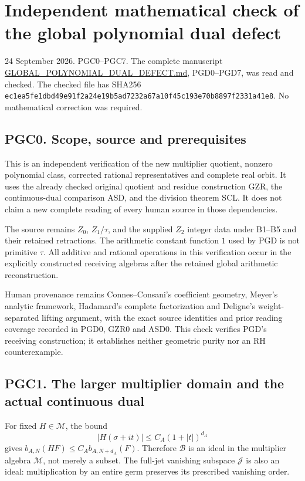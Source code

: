 \section{Independent mathematical check of the global polynomial dual
defect}\label{independent-mathematical-check-of-the-global-polynomial-dual-defect}

24 September 2026. PGC0--PGC7. The complete manuscript
\url{GLOBAL_POLYNOMIAL_DUAL_DEFECT.md}, PGD0--PGD7, was read and
checked. The checked file has SHA256
\nolinkurl{ec1ea5fe1dbd49e91f2a24e19b5ad7232a67a10f45c193e70b8897f2331a41e8}. No
mathematical correction was required.

\subsection{PGC0. Scope, source and
prerequisites}\label{pgc0.-scope-source-and-prerequisites}

This is an independent verification of the new multiplier quotient,
nonzero polynomial class, corrected rational representatives and
complete real orbit. It uses the already checked original quotient and
residue construction GZR, the continuous-dual comparison ASD, and the
division theorem SCL. It does not claim a new complete reading of every
human source in those dependencies.

The source remains \(Z_0\), \(Z_1/\tau\), and the supplied \(Z_2\)
integer data under B1--B5 and their retained retractions. The arithmetic
constant function \(1\) used by PGD is not primitive \(\tau\). All
additive and rational operations in this verification occur in the
explicitly constructed receiving algebras after the retained global
arithmetic reconstruction.

Human provenance remains Connes--Consani's coefficient geometry, Meyer's
analytic framework, Hadamard's complete factorization and Deligne's
weight-separated lifting argument, with the exact source identities and
prior reading coverage recorded in PGD0, GZR0 and ASD0. This check
verifies PGD's receiving construction; it establishes neither geometric
purity nor an RH counterexample.

\subsection{PGC1. The larger multiplier domain and the actual continuous
dual}\label{pgc1.-the-larger-multiplier-domain-and-the-actual-continuous-dual}

For fixed \(H\in\mathcal M\), the bound \[
 |H(\sigma+it)|\le C_A(1+|t|)^{d_A}
\] gives \(b_{A,N}(HF)\le C_A b_{A,N+d_A}(F)\). Therefore \(\mathcal B\)
is an ideal in the multiplier algebra \(\mathcal M\), not merely a
subset. The full-jet vanishing subspace \(\mathcal J\) is also an ideal:
multiplication by an entire germ preserves its prescribed vanishing
order.

